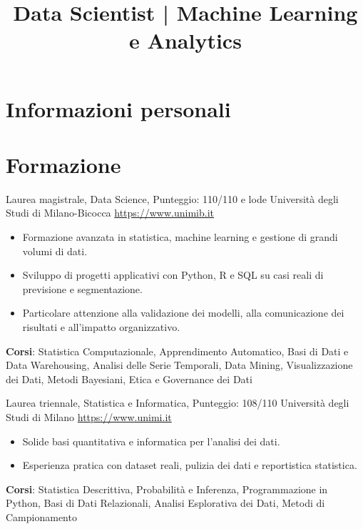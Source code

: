 \documentclass[a4paper, serif, 10pt]{moderncv}
\title{Data Scientist | Machine Learning e Analytics}
\begin{document}
\maketitle

\section{Informazioni personali}

\section{Formazione}

        {Laurea magistrale, Data Science, Punteggio: 110/110 e lode}
        {Università degli Studi di Milano-Bicocca}
        {\url{https://www.unimib.it}}
        {}
        {\begin{itemize}
\item Formazione avanzata in statistica, machine learning e gestione di grandi volumi di dati.
\item Sviluppo di progetti applicativi con Python, R e SQL su casi reali di previsione e segmentazione.
\item Particolare attenzione alla validazione dei modelli, alla comunicazione dei risultati e all'impatto organizzativo.
\end{itemize}
\textbf{Corsi}: Statistica Computazionale, Apprendimento Automatico, Basi di Dati e Data Warehousing, Analisi delle Serie Temporali, Data Mining, Visualizzazione dei Dati, Metodi Bayesiani, Etica e Governance dei Dati}

        {Laurea triennale, Statistica e Informatica, Punteggio: 108/110}
        {Università degli Studi di Milano}
        {\url{https://www.unimi.it}}
        {}
        {\begin{itemize}
\item Solide basi quantitativa e informatica per l'analisi dei dati.
\item Esperienza pratica con dataset reali, pulizia dei dati e reportistica statistica.
\end{itemize}
\textbf{Corsi}: Statistica Descrittiva, Probabilità e Inferenza, Programmazione in Python, Basi di Dati Relazionali, Analisi Esplorativa dei Dati, Metodi di Campionamento}
\end{document}
